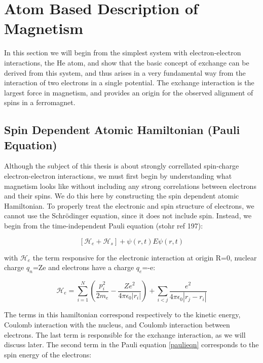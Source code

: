 \section{Atom Based Description of Magnetism}

In this section we will begin from the simplest system with electron-electron interactions, the He atom, and show that the basic concept of exchange can be derived from this system, and thus arises in a very fundamental way from the interaction of two electrons in a single potential. The exchange interaction is the largest force in magnetism, and provides an origin for the observed alignment of spins in a ferromagnet. 


\subsection{Spin Dependent Atomic Hamiltonian (Pauli Equation)}

Although the subject of this thesis is about strongly correllated spin-charge electron-electron interactions, we must first begin by understanding what magnetism looks like without including any strong correlations between electrons and their spins. We do this here by constructing the spin dependent atomic Hamiltonian. To properly treat the electronic and spin structure of electrons, we cannot use the Schr\"odinger equation, since it does not include spin. Instead, we begin from the time-independent Pauli equation (stohr ref 197):

\begin{equation}
 \left[\mathscr{H}_e+\mathscr{H}_s\right]+ \psi\left(r,t\right)E \psi \left(r,t\right)
 \label{paulieqn}
 \end{equation}
 
with $\mathscr{H}_e$ the term responsive for the electronic interaction at origin R=0, nuclear charge $q_n$=Ze and electrons have a charge $q_e$=-e:
 
 \begin{equation}
\mathscr{H}_e = \sum_{i=1}^{N}\left(\frac{p_i^2}{2m_e}-\frac{Ze^2}{4\pi\epsilon_0|r_i|}\right) + \sum_{i<j}\frac{e^2}{4\pi\epsilon_0|r_j-r_i|}
\label{chargeham}
 \end{equation}
 
The terms in this hamiltonian correspond respectively to the kinetic energy, Coulomb interaction with the nucleus, and Coulomb interaction between electrons. The last term is responsible for the exchange interaction, as we will discuss later.
The second term in the Pauli equation \ref{paulieqn} corresponds to the spin energy of the electrons:

